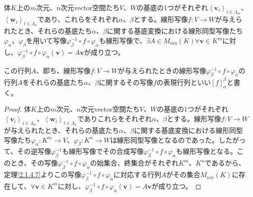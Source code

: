 \documentclass[dvipdfmx]{jsarticle}
\begin{document}
\begin{thm}
\label{2.1.5.3}
体$K$上の$m$次元、$n$次元vector空間たち$V$、$W$の基底の1つがそれぞれ$\left\langle \mathbf{v}_{i} \right\rangle_{i \in \varLambda_{m}}$、$\left\langle \mathbf{w}_{i} \right\rangle_{i \in \varLambda_{n}}$であり、これらをそれぞれ$\alpha$、$\beta$とする。線形写像$f:V \rightarrow W$が与えられたとき、それらの基底たち$\alpha$、$\beta$に関する基底変換における線形同型写像たち$\varphi_{\alpha}$、$\varphi_{\beta}$を用いて写像$\varphi_{\beta}^{- 1} \circ f \circ \varphi_{\alpha}$も線形写像で、$\exists A \in M_{nm}(K)\forall\mathbf{v} \in K^{m}$に対し、$\varphi_{\beta}^{- 1} \circ f \circ \varphi_{\alpha}\left( \mathbf{v} \right) = A\mathbf{v}$が成り立つ。
\begin{center}
\end{center}
\end{thm}
\begin{dfn}
この行列$A$、即ち、線形写像$f:V \rightarrow W$が与えられたときの線形写像$\varphi_{\beta}^{- 1} \circ f \circ \varphi_{\alpha}$の行列$A$をそれらの基底たち$\alpha$、$\beta$に関するその写像$f$の表現行列といい$[ f]^{\beta}_{\alpha}$と書く。
\end{dfn}
\begin{proof}
体$K$上の$m$次元、$n$次元vector空間たち$V$、$W$の基底の1つがそれぞれ$\left\langle \mathbf{v}_{i} \right\rangle_{i \in \varLambda_{m}}$、$\left\langle \mathbf{w}_{i} \right\rangle_{i \in \varLambda_{n}}$でありこれらをそれぞれ$\alpha$、$\beta$とする。線形写像$f:V \rightarrow W$が与えられたとき、それらの基底たち$\alpha$、$\beta$に関する基底変換における線形同型写像たち$\varphi_{\alpha}:K^{m} \rightarrow V$、$\varphi_{\beta}:K^{n} \rightarrow W$は線形同型写像となるのであった。したがって、その逆写像$\varphi_{\beta}^{- 1}$も線形写像でその合成写像$\varphi_{\beta}^{- 1} \circ f \circ \varphi_{\alpha}$も線形写像となる。このとき、その写像$\varphi_{\beta}^{- 1} \circ f \circ \varphi_{\alpha}$の始集合、終集合がそれぞれ$K^{m}$、$K^{n}$であるから、定理\ref{2.1.4.7}よりこの写像$\varphi_{\beta}^{- 1} \circ f \circ \varphi_{\alpha}$に対応する行列$A$がその集合$M_{nm}(K)$に存在して、$\forall\mathbf{v} \in K^{m}$に対し、$\varphi_{\beta}^{- 1} \circ f \circ \varphi_{\alpha}\left( \mathbf{v} \right) = A\mathbf{v}$が成り立つ。
\end{proof}
\end{document}
